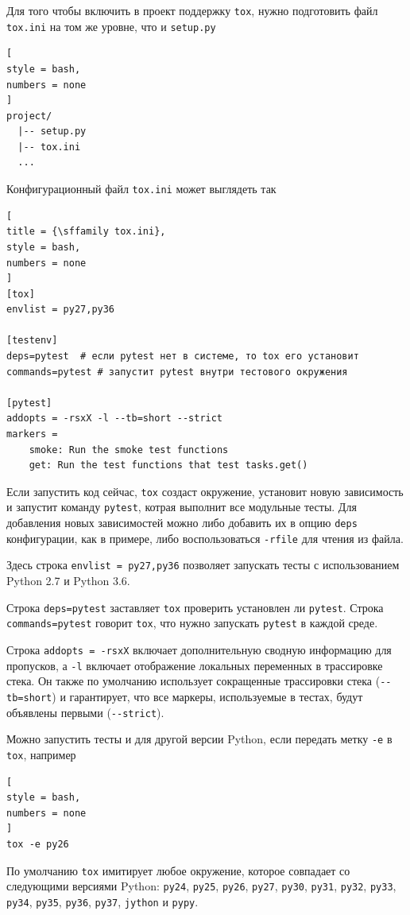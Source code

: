 \documentclass[%
	11pt,
	a4paper,
	utf8,
		]{article}
\begin{document}
Для того чтобы включить в проект поддержку \texttt{tox}, нужно подготовить файл \texttt{tox.ini} на том же уровне, что и \texttt{setup.py}
\begin{lstlisting}[
style = bash,
numbers = none	
]
project/
  |-- setup.py
  |-- tox.ini
  ...
\end{lstlisting}

Конфигурационный файл \texttt{tox.ini} может выглядеть так
\begin{lstlisting}[
title = {\sffamily tox.ini},
style = bash,
numbers = none	
]
[tox]
envlist = py27,py36

[testenv]
deps=pytest  # если pytest нет в системе, то tox его установит
commands=pytest # запустит pytest внутри тестового окружения

[pytest]
addopts = -rsxX -l --tb=short --strict
markers = 
    smoke: Run the smoke test functions
    get: Run the test functions that test tasks.get()

\end{lstlisting}

Если запустить код сейчас, \texttt{tox} создаст окружение, установит новую зависимость и запустит команду \texttt{pytest}, котрая выполнит все модульные тесты. Для добавления новых зависимостей можно либо добавить их в опцию \texttt{deps} конфигурации, как в примере, либо воспользоваться \verb|-rfile| для чтения из файла.

Здесь строка \texttt{envlist = py27,py36} позволяет запускать тесты с использованием Python 2.7 и Python 3.6.

Строка \texttt{deps=pytest} заставляет \texttt{tox} проверить установлен ли \texttt{pytest}. Строка \texttt{commands=pytest} говорит \texttt{tox}, что нужно запускать \texttt{pytest} в каждой среде.

Строка \texttt{addopts = -rsxX} включает дополнительную сводную информацию для пропусков, а \texttt{-l} включает отображение локальных переменных в трассировке стека. Он также по умолчанию использует сокращенные трассировки стека (\verb|--tb=short|) и гарантирует, что все маркеры, используемые в тестах, будут объявлены первыми (\verb|--strict|). 

Можно запустить тесты и для другой версии Python, если передать метку \verb|-e| в \texttt{tox}, например
\begin{lstlisting}[
style = bash,
numbers = none
]
tox -e py26
\end{lstlisting}

По умолчанию \texttt{tox} имитирует любое окружение, которое совпадает со следующими версиями Python: \texttt{py24}, \texttt{py25}, \texttt{py26}, \texttt{py27}, \texttt{py30}, \texttt{py31}, \texttt{py32}, \texttt{py33}, \texttt{py34}, \texttt{py35}, \texttt{py36}, \texttt{py37}, \texttt{jython} и \texttt{pypy}.
\end{document}

